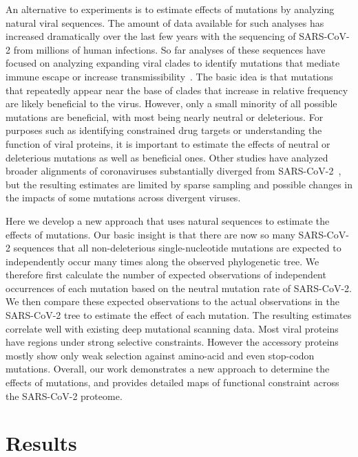 \documentclass[9pt,twocolumn,twoside]{gsajnl_modified}
\begin{document}
An alternative to experiments is to estimate effects of mutations by analyzing natural viral sequences.
The amount of data available for such analyses has increased dramatically over the last few years with the sequencing of SARS-CoV-2 from millions of human infections.
So far analyses of these sequences have focused on analyzing expanding viral clades to identify mutations that mediate immune escape or increase transmissibility~\citep{obermeyer2022analysis,lee2022inferring,maher2022predicting}.
The basic idea is that mutations that repeatedly appear near the base of clades that increase in relative frequency are likely beneficial to the virus.
However, only a small minority of all possible mutations are beneficial, with most being nearly neutral or deleterious.
For purposes such as identifying constrained drug targets or understanding the function of viral proteins, it is important to estimate the effects of neutral or deleterious mutations as well as beneficial ones.
Other studies have analyzed broader alignments of coronaviruses substantially diverged from SARS-CoV-2~\citep{rodriguez2022epistatic, thadani2022learning}, but the resulting estimates are limited by sparse sampling and possible changes in the impacts of some mutations across divergent viruses.

Here we develop a new approach that uses natural sequences to estimate the effects of mutations.
Our basic insight is that there are now so many SARS-CoV-2 sequences that all non-deleterious single-nucleotide mutations are expected to independently occur many times along the observed phylogenetic tree.
We therefore first calculate the number of expected observations of independent occurrences of each mutation based on the neutral mutation rate of SARS-CoV-2.
We then compare these expected observations to the actual observations in the SARS-CoV-2 tree to estimate the effect of each mutation.
The resulting estimates correlate well with existing deep mutational scanning data.
Most viral proteins have regions under strong selective constraints.
However the accessory proteins mostly show only weak selection against amino-acid and even stop-codon mutations.
Overall, our work demonstrates a new approach to determine the effects of mutations, and provides detailed maps of functional constraint across the SARS-CoV-2 proteome.

\section{Results}
\end{document}
